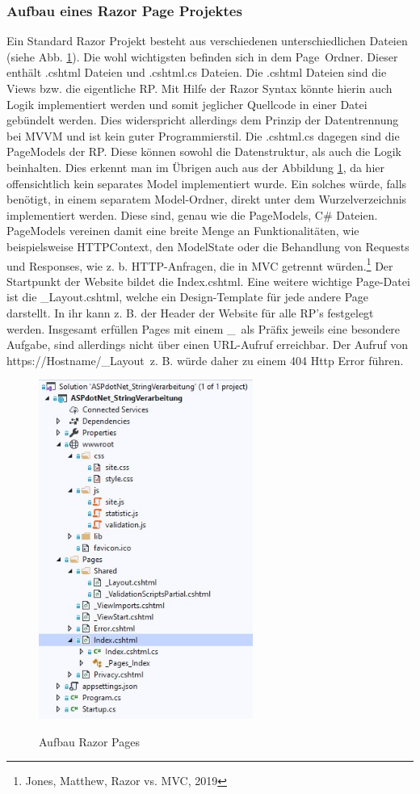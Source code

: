 \documentclass[a4paper,
12pt,
oneside]
{article}
\begin{document}
	\subsubsection{Aufbau eines Razor Page Projektes}
	Ein Standard Razor Projekt besteht aus verschiedenen unterschiedlichen Dateien (siehe Abb. \ref{fig:aufbau}). Die wohl wichtigsten befinden sich in dem \glqq Page\grqq~Ordner. Dieser enthält .cshtml Dateien und .cshtml.cs Dateien. Die .cshtml Dateien sind die Views bzw. die eigentliche RP. Mit Hilfe der Razor Syntax könnte hierin auch Logik implementiert werden und somit jeglicher Quellcode in einer Datei gebündelt werden. Dies widerspricht allerdings dem Prinzip der Datentrennung bei MVVM und ist kein guter Programmierstil. Die .cshtml.cs dagegen sind die PageModels der RP. Diese können sowohl die Datenstruktur, als auch die Logik beinhalten. Dies erkennt man im Übrigen auch aus der Abbildung \ref{fig:aufbau}, da hier offensichtlich kein separates Model implementiert wurde. Ein solches würde, falls benötigt, in einem separatem Model-Ordner, direkt unter dem Wurzelverzeichnis implementiert werden. Diese sind, genau wie die PageModels, C\# Dateien. PageModels vereinen damit eine breite Menge an Funktionalitäten, wie beispielsweise HTTPContext, den ModelState oder die Behandlung von Requests und Responses, wie z. b. HTTP-Anfragen, die in MVC getrennt würden.\footnote{Jones, Matthew, Razor vs. MVC, 2019} Der Startpunkt der Website bildet die Index.cshtml. Eine weitere wichtige Page-Datei ist die \_Layout.cshtml, welche ein Design-Template für jede andere Page darstellt. In ihr kann z. B. der Header der Website für alle RP's festgelegt werden. Insgesamt erfüllen Pages mit einem \glqq\_\grqq~als Präfix jeweils eine besondere Aufgabe, sind allerdings nicht über einen URL-Aufruf erreichbar. Der Aufruf von \glqq https://Hostname/\_Layout\grqq~z. B. würde daher zu einem 404 Http Error führen.
	\begin{figure}
		\centering
		\caption{Aufbau Razor Pages} 
		\includegraphics[width=7cm]{img/aufbau.jpg} \\
		\label{fig:aufbau}
	\end{figure}
\end{document}
